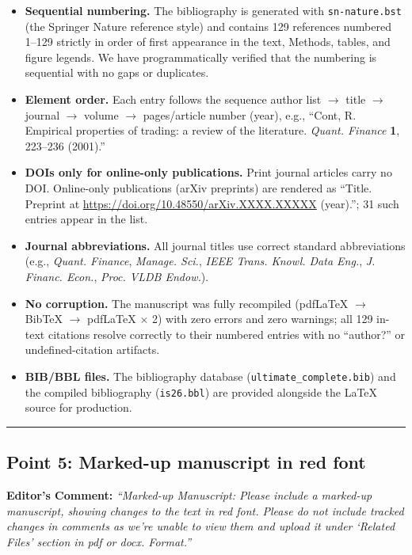 \documentclass[11pt,a4paper]{article}
\begin{document}
\begin{itemize}
  \item \textbf{Sequential numbering.} The bibliography is generated with \texttt{sn-nature.bst} (the Springer Nature reference style) and contains 129 references numbered 1--129 strictly in order of first appearance in the text, Methods, tables, and figure legends. We have programmatically verified that the numbering is sequential with no gaps or duplicates.
  \item \textbf{Element order.} Each entry follows the sequence author list $\rightarrow$ title $\rightarrow$ journal $\rightarrow$ volume $\rightarrow$ pages/article number (year), e.g., ``Cont, R. Empirical properties of trading: a review of the literature. \textit{Quant. Finance} \textbf{1}, 223--236 (2001).''
  \item \textbf{DOIs only for online-only publications.} Print journal articles carry no DOI. Online-only publications (arXiv preprints) are rendered as ``Title. Preprint at \url{https://doi.org/10.48550/arXiv.XXXX.XXXXX} (year).''; 31 such entries appear in the list.
  \item \textbf{Journal abbreviations.} All journal titles use correct standard abbreviations (e.g., \textit{Quant. Finance}, \textit{Manage. Sci.}, \textit{IEEE Trans. Knowl. Data Eng.}, \textit{J. Financ. Econ.}, \textit{Proc. VLDB Endow.}).
  \item \textbf{No corruption.} The manuscript was fully recompiled (pdf\LaTeX{} $\rightarrow$ Bib\TeX{} $\rightarrow$ pdf\LaTeX{} $\times$ 2) with zero errors and zero warnings; all 129 in-text citations resolve correctly to their numbered entries with no ``author?'' or undefined-citation artifacts.
  \item \textbf{BIB/BBL files.} The bibliography database (\texttt{ultimate\_complete.bib}) and the compiled bibliography (\texttt{is26.bbl}) are provided alongside the LaTeX source for production.
\end{itemize}

\vspace{1.5em}
\hrule
\vspace{1.5em}

\subsection*{Point 5: Marked-up manuscript in red font}

\vspace{0.5em}
\noindent\textbf{Editor's Comment:}
\textit{``Marked-up Manuscript: Please include a marked-up manuscript, showing changes to the text in red font. Please do not include tracked changes in comments as we're unable to view them and upload it under `Related Files' section in pdf or docx. Format.''}
\end{document}
